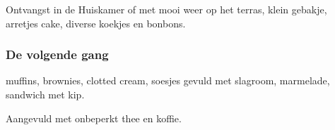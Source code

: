 Ontvangst in de Huiskamer of met mooi weer op het terras,
klein gebakje, arretjes cake, diverse koekjes
en bonbons.

\subsubsection*{De volgende gang}
muffins, brownies, clotted cream, soesjes gevuld met slagroom, marmelade,
 sandwich met kip.

Aangevuld met onbeperkt thee en koffie.
